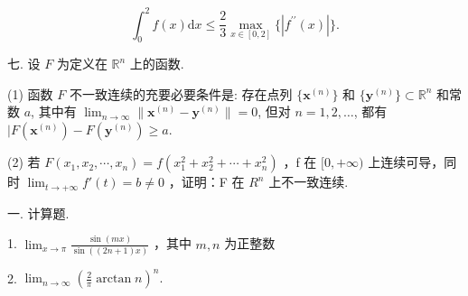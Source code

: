 \documentclass{examcollection}
\renewcommand{\displayformula}[1]{\[#1\]}
\begin{document}
{\begin{minipage}{\textwidth}
\displayformula{\int_ {0} ^ {2} f (x) \mathrm{d} x \leq \frac {2}{3} \max _ {x \in [ 0, 2 ]} \{| f ^ {\prime \prime} (x) | \}.}\par
七. 设 $F$ 为定义在 $\mathbb{R}^n$ 上的函数.\par
(1) 函数 $F$ 不一致连续的充要必要条件是: 存在点列 $\{\pmb{x}^{(n)}\}$ 和 $\{\pmb{y}^{(n)}\} \subset \mathbb{R}^n$ 和常数 $a$, 其中有 $\lim_{n \to \infty} \| \pmb{x}^{(n)} - \pmb{y}^{(n)} \| = 0$, 但对 $n = 1, 2, \dots$, 都有 $|F(\pmb{x}^{(n)}) - F(\pmb{y}^{(n)}) \geq a$.\par
(2) 若  $F(x_{1}, x_{2}, \cdots, x_{n}) = f(x_{1}^{2} + x_{2}^{2} + \cdots + x_{n}^{2})$ ，f 在  $[0, +\infty)$  上连续可导，同时  $\lim_{t \to +\infty} f'(t) = b \neq 0$ ，证明：F 在  $R^{n}$  上不一致连续.\par
{}\smallskip
一. 计算题.\par
1. $\lim_{x\to \pi}\frac{\sin(mx)}{\sin((2n + 1)x)}$ ，其中 $m,n$ 为正整数\par
2.  $\lim_{n\to\infty}\left(\frac{2}{\pi}\arctan n\right)^{n}.$\par
\end{minipage}}
\ifdim\dimexpr\ht\proofbox+\dp\proofbox\relax>\textheight
\noindent\resizebox{!}{\textheight}{\usebox{\proofbox}}\else\noindent\usebox{\proofbox}\fi\clearpage
\end{document}
